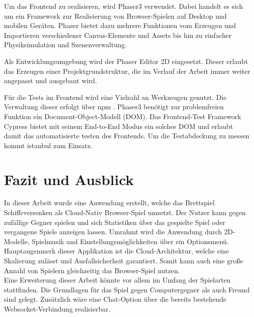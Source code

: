 \documentclass[a4paper, 10pt, conference]{IEEEtran}
\begin{document}
Um das Frontend zu realisieren, wird Phaser3 \cite{phaser} verwendet. Dabei handelt es sich um ein Framework zur Realisierung von Browser-Spielen auf Desktop und mobilen Geräten. Phaser bietet dazu mehrere Funktionen vom Erzeugen und Importieren verschiedener Canvas-Elemente und Assets bis hin zu einfacher Physiksimulation und Szenenverwaltung.

Als Entwicklungsumgebung wird der Phaser Editor 2D eingesetzt. Dieser erlaubt das Erzeugen einer Projektgrundstruktur, die im Verlauf der Arbeit immer weiter angepasst und ausgebaut wird.  

Für die Tests im Frontend wird eine Vielzahl an Werkzeugen genutzt. Die Verwaltung dieser erfolgt über npm \cite{npm}. Phaser3 benötigt zur problemfreien Funktion ein Document-Object-Modell (DOM). Das Frontend-Test Framework Cypress \cite{cypress} bietet mit seinem End-to-End Modus ein solches DOM und erlaubt damit das automatisierte testen des Frontends. Um die Testabdeckung zu messen kommt istanbul \cite{istanbul} zum Einsatz.



\section{Fazit und Ausblick}\label{sec:fazit}
In dieser Arbeit wurde eine Anwendung erstellt, welche das Brettspiel Schiffeversenken als Cloud-Nativ Browser-Spiel umsetzt. Der Nutzer kann gegen zufällige Gegner spielen und sich Statistiken über das gespielte Spiel oder vergangene Spiele anzeigen lassen. Umrahmt wird die Anwendung durch 2D-Modelle, Spielmusik und Einstellungsmöglichkeiten über ein Optionsmenü. Hauptaugenmerk dieser Applikation ist die Cloud-Architektur, welche eine Skalierung zulässt und Ausfallsicherheit garantiert. Somit kann auch eine große Anzahl von Spielern gleichzeitig das Browser-Spiel nutzen.\\
Eine Erweiterung dieser Arbeit könnte vor allem im Umfang der Spielarten stattfinden. Die Grundlagen für das Spiel gegen Computergegner als auch Freund sind gelegt. Zusätzlich wäre eine Chat-Option über die bereits bestehende Websocket-Verbindung realisierbar. \\



\printbibliography
\end{document}

